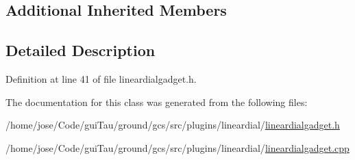 \subsection*{Additional Inherited Members}


\subsection{Detailed Description}


Definition at line 41 of file lineardialgadget.\-h.



The documentation for this class was generated from the following files\-:\begin{DoxyCompactItemize}
\item 
/home/jose/\-Code/gui\-Tau/ground/gcs/src/plugins/lineardial/\hyperlink{lineardialgadget_8h}{lineardialgadget.\-h}\item 
/home/jose/\-Code/gui\-Tau/ground/gcs/src/plugins/lineardial/\hyperlink{lineardialgadget_8cpp}{lineardialgadget.\-cpp}\end{DoxyCompactItemize}
